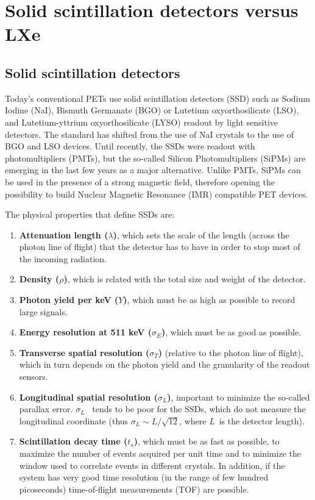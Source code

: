 
\section{Solid scintillation detectors versus LXe}
\label{sec.ssd}

\subsection{Solid scintillation detectors}

Today's conventional PETs use solid scintillation detectors (SSD) such as Sodium Iodine (NaI), Bismuth Germanate (BGO) or Lutetium oxyorthosilicate (LSO), and Lutetium-yttrium oxyorthosilicate (LYSO) readout by light sensitive detectors. The standard has shifted from the use of NaI crystals to the use of BGO and LSO devices. Until recently, the SSDs were readout with photomultipliers (PMTs), but the so-called Silicon Photomultipliers (SiPMs) are emerging in the last few years as a major alternative. Unlike PMTs, SiPMs can be used in the presence of a strong magnetic field, therefore opening the possibility to build Nuclear Magnetic Resonance (IMR) compatible PET devices. 

The physical properties that define SSDs are: 
\begin{enumerate}
\item {\bf Attenuation length ($\lambda$)}, which sets the scale of the length (across the photon line of flight) that the detector has to have in order to stop most of the incoming radiation.
\item {\bf Density ($\rho$)}, which is related with the total size and weight of the detector.
\item {\bf Photon yield per keV ($Y$)}, which must be as high as possible to record large signals. 
\item {\bf Energy resolution at 511 keV ($\sigma_E$)}, which must be as good as possible. 
\item {\bf Transverse spatial resolution ($\sigma_T$)} (relative to the photon line of flight), which in turn depends on the photon yield and the granularity of the readout sensors.
\item {\bf Longitudinal spatial resolution ($\sigma_L$)}, important to minimize the so-called parallax error.  $\sigma_L$~  tends to be poor for the SSDs, which do not measure the longitudinal coordinate (thus $\sigma_L \sim L/\sqrt{12}$, where $L$~is the detector length). 
\item {\bf Scintillation decay time ($t_s$)}, which must be as fast as possible, to maximize the number of events acquired per unit time and to minimize the window used to correlate events in different crystals. In addition, if the system has very good time resolution (in the range of few hundred picoseconds) time-of-flight measurements (TOF) are possible.  
\end{enumerate}

